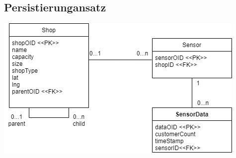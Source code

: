 \documentclass[runningheads]{llncs}
\begin{document}
\subsection{Persistierungansatz}
\includegraphics[width=\linewidth]{images/Datamodel}
\end{document}
